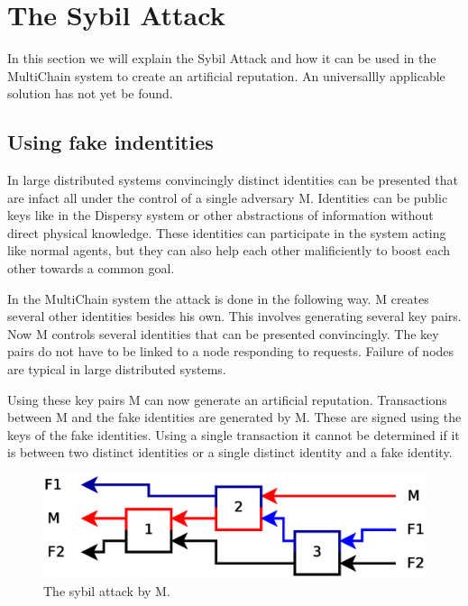 \section{The Sybil Attack}

In this section we will explain the Sybil Attack\cite{douceur-sybil}
and how it can be used in the MultiChain system to create an artificial reputation.
An universallly applicable solution has not yet be found\cite{levine-sybilsurvey}.

\subsection{Using fake indentities}
In large distributed systems convincingly distinct identities can be presented
that are infact all under the control of a single adversary M.
Identities can be public keys like in the Dispersy system
or other abstractions of information without direct physical knowledge.
These identities can participate in the system acting like normal agents,
but they can also help each other malificiently to boost each other towards a common goal.

In the MultiChain system the attack is done in the following way.
M creates several other identities besides his own.
This involves generating several key pairs.
Now M controls several identities that can be presented convincingly.
The key pairs do not have to be linked to a node responding to requests.
Failure of nodes are typical in large distributed systems.

Using these key pairs M can now generate an artificial reputation.
Transactions between M and the fake identities are generated by M.
These are signed using the keys of the fake identities.
Using a single transaction it cannot be determined if it is between two distinct identities or a single distinct identity and a fake identity.

\begin{figure}
	\centerline{\includegraphics[scale=0.3]{problems/figs/sybil.eps}}
	\caption{The sybil attack by M.}
	\label{fig:sybil-example}
\end{figure}

